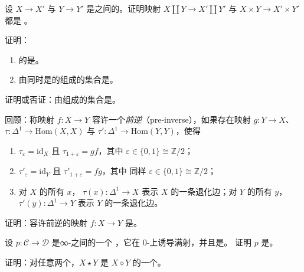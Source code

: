 \begin{exercise}\label{ex:joyal-equivalence-coproduct-product}
设 $X \to X'$ 与 $Y \to Y'$ 是\trSimplicialSet{}之间的\trJoyalEquivalence{}。证明映射
$X \amalg Y \to X' \amalg Y'$ 与 $X \times Y \to X' \times Y'$ 都是%
\trJoyalEquivalence{}。
\end{exercise}

\begin{exercise}\label{ex:joyal-equivalence-retract-saturated}
证明：
\begin{enumerate}[label=(\arabic*)]
  \item \trJoyalEquivalence{}的\trRetract{}是\trJoyalEquivalence{}。
  \item 由同时是\trJoyalEquivalence{}的\trMonomorphism{}组成的集合是\trSaturated{}。
\end{enumerate}
证明或否证：由\trJoyalEquivalence{}组成的集合是\trSaturated{}。
\end{exercise}

\begin{exercise}\label{ex:pre-inverse}
回顾：称映射 $f\colon X \to Y$ 容许一个\emph{前逆}（pre-inverse），如果存在映射
$g\colon Y \to X$、$\tau\colon \Delta^1 \to \mathrm{Hom}(X, X)$ 与
$\tau'\colon \Delta^1 \to \mathrm{Hom}(Y, Y)$，使得
\begin{enumerate}[label=(\arabic*)]
  \item $\tau_{\varepsilon} = \mathrm{id}_X$ 且 $\tau_{1+\varepsilon} = gf$，其中
        $\varepsilon \in \{0, 1\} \cong \mathbb{Z}/2$；
  \item $\tau'_{\varepsilon} = \mathrm{id}_Y$ 且 $\tau'_{1+\varepsilon} = fg$，其中
        同样 $\varepsilon \in \{0, 1\} \cong \mathbb{Z}/2$；
  \item 对 $X$ 的所有\trObject{} $x$，\trMorphism{} $\tau(x)\colon \Delta^1 \to X$
        表示 $X$ 的一条退化边；对 $Y$ 的所有\trObject{} $y$，
        $\tau'(y)\colon \Delta^1 \to Y$ 表示 $Y$ 的一条退化边。
\end{enumerate}
证明：容许前逆的映射 $f\colon X \to Y$ 是\trJoyalEquivalence{}。
\end{exercise}

\begin{exercise}\label{ex:inner-fibration-trivial}
设 $p\colon \mathcal{C} \to \mathcal{D}$ 是∞-\trCategories{}之间的一个%
\trInnerFibration{}，它在 $0$-\trSimplex{}上诱导满射，并且是\trJoyalEquivalence{}。
证明 $p$ 是\trTrivialFibration{}。
\end{exercise}

\begin{exercise}\label{ex:join-retract-fat-join}
证明：对任意两个\trSimplicialSet{}，$X \star Y$ 是 $X \diamond Y$ 的一个\trRetract{}。
\end{exercise}

